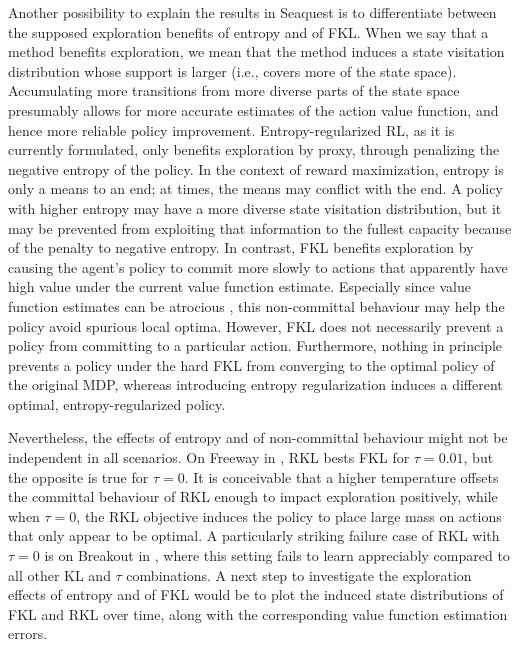 \documentclass[twoside,11pt]{article}
\begin{document}
Another possibility to explain the results in Seaquest is to differentiate between the supposed exploration benefits of entropy and of FKL. When we say that a method benefits exploration, we mean that the method induces a state visitation distribution whose support is larger (i.e., covers more of the state space). Accumulating more transitions from more diverse parts of the state space presumably allows for more accurate estimates of the action value function, and hence more reliable policy improvement. Entropy-regularized RL, as it is currently formulated, only benefits exploration by proxy, through penalizing the negative entropy of the policy. In the context of reward maximization, entropy is only a means to an end; at times, the means may conflict with the end. A policy with higher entropy may have a more diverse state visitation distribution, but it may be prevented from exploiting that information to the fullest capacity because of the penalty to negative entropy. In contrast, FKL benefits exploration by causing the agent's policy to commit more slowly to actions that apparently have high value under the current value function estimate. Especially since value function estimates can be atrocious \citep{ilyas2018deep}, this non-committal behaviour may help the policy avoid spurious local optima. However, FKL does not necessarily prevent a policy from committing to a particular action. Furthermore, nothing in principle prevents a policy under the hard FKL from converging to the optimal policy of the original MDP, whereas introducing entropy regularization induces a different optimal, entropy-regularized policy. 

Nevertheless, the effects of entropy and of non-committal behaviour might not be independent in all scenarios. On Freeway in , RKL bests FKL for $\tau = 0.01$, but the opposite is true for $\tau = 0$. It is conceivable that a higher temperature offsets the committal behaviour of RKL enough to impact exploration positively, while when $\tau = 0$, the RKL objective induces the policy to place large mass on actions that only appear to be optimal. A particularly striking failure case of RKL with $\tau = 0$ is on Breakout in , where this setting fails to learn appreciably compared to all other KL and $\tau$ combinations. A next step to investigate the exploration effects of entropy and of FKL would be to plot the induced state distributions of FKL and RKL over time, along with the corresponding value function estimation errors. 
\end{document}
